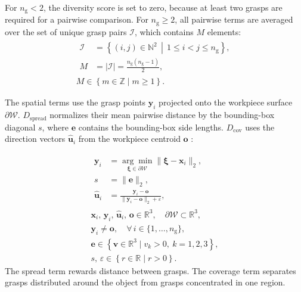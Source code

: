 For $n_{\mathrm{g}} < 2$, the diversity score is set to zero, because at least
two grasps are required for a pairwise comparison. For $n_{\mathrm{g}} \geq 2$,
all pairwise terms are averaged over the set of unique grasp pairs
$\mathcal{I}$, which contains $M$ elements:
\begin{equation}
    \label{eq:grasp_pairs}
    \begin{gathered}
        \begin{aligned}
            \mathcal{I}
            &=
            \left\{ (i,j) \in \mathbb{N}^{2}
            \,\middle|\,
            1 \le i < j \le n_{\mathrm{g}} \right\},
            \\[3pt]
            M
            &=
            |\mathcal{I}|
            =
            \frac{n_{\mathrm{g}}(n_{\mathrm{g}}-1)}{2},
        \end{aligned}
        \\[4pt]
        M \in \left\{ m \in \mathbb{Z} \mid m \ge 1 \right\}.
    \end{gathered}
\end{equation}

The spatial terms use the grasp points $\mathbf{y}_{i}$ projected onto the
workpiece surface $\partial\mathcal{W}$. $D_{\mathrm{spread}}$ normalizes their
mean pairwise distance by the bounding-box diagonal $s$, where $\mathbf{e}$
contains the bounding-box side lengths. $D_{\mathrm{cov}}$ uses the direction
vectors $\hat{\mathbf{u}}_{i}$ from the workpiece centroid $\mathbf{o}$ :

\begin{equation}
    \label{eq:grasp_spatial_terms}
    \begin{gathered}
        \begin{aligned}
            \mathbf{y}_{i}
            &=
            \underset{\boldsymbol{\xi} \in \partial\mathcal{W}}{\arg\min}
            \|\boldsymbol{\xi} - \mathbf{x}_{i}\|_{2},
            \\[3pt]
            s
            &=
            \|\mathbf{e}\|_{2},
            \\[3pt]
            \hat{\mathbf{u}}_{i}
            &=
            \frac{\mathbf{y}_{i} - \mathbf{o}}
            {\|\mathbf{y}_{i} - \mathbf{o}\|_{2} + \varepsilon},
        \end{aligned}
        \\[4pt]
        \mathbf{x}_{i},\, \mathbf{y}_{i},\, \hat{\mathbf{u}}_{i},\, \mathbf{o}
        \in \mathbb{R}^{3},
        \quad
        \partial\mathcal{W} \subset \mathbb{R}^{3},
        \\[2pt]
        \mathbf{y}_{i} \neq \mathbf{o},
        \quad
        \forall\, i \in \{1,\ldots,n_{\mathrm{g}}\},
        \\[2pt]
        \mathbf{e} \in
        \left\{ \mathbf{v} \in \mathbb{R}^{3} \mid v_{k} > 0,\ k = 1,2,3 \right\},
        \\[2pt]
        s,\, \varepsilon \in \left\{ r \in \mathbb{R} \mid r > 0 \right\}.
    \end{gathered}
\end{equation}
The spread term rewards distance between grasps. The coverage term separates
grasps distributed around the object from grasps concentrated in one region.

